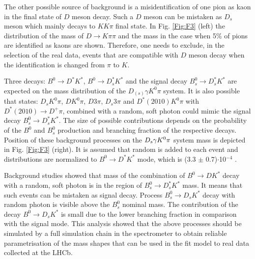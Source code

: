 \documentclass{appolb}
\begin{document}
The other possible source of background is a misidentification of one pion as kaon in the final state of $D$ meson decay. Such a $D$ meson can be mistaken as $D_s$ meson which mainly decays to $K K \pi$ final state. In Fig. \ref{Fig:F3} (left) the distribution of the mass of $D \rightarrow K \pi \pi$ and the mass in the case when 5\% of pions are identified as kaons are shown. Therefore, one needs to exclude, in the selection of the real data, events that are compatible with $D$ meson decay when the identification is changed from $\pi$  to $K$.  

Three decays: $B^0 \rightarrow D^* K^*$, $B^0 \rightarrow D^*_s K^*$ and the signal decay $B_s^0\rightarrow D^*_s K^*$ are expected on the mass distribution of the $D_{(s)} \gamma K^0 \pi$ system. It is also possible that states: $D_s K^0 \pi$, $D K^0 \pi$, $D 3\pi$, $D_s 3\pi$ and  $D^*(2010)K^0 \pi$ with $D^*(2010)\rightarrow D^+ \pi$, combined with a random, soft photon could mimic the signal decay $ B^0_s\rightarrow D^*_s K^*$. The size of possible contributions depends on the probability of the $B^0$ and $B^0_s$ production and branching fraction of the respective decays. Position of these background processes on the $D_s {\gamma} K^0 \pi$ system mass is depicted in Fig. \ref{Fig:F3} (right). It is assumed that random \g is added to each event and distributions are normalized to $B^0\rightarrow D^*K^*$ mode, which is (3.3 $\pm$ 0.7)$\cdot$10$^{-4}$ \cite{pdg_group}. 

Background studies showed that mass of the combination of  $B^0 \rightarrow DK^*$ decay with a random, soft photon is in the region of  $B_s^0 \rightarrow D^*_s K^*$ mass. It means that such events can be mistaken as signal decay. Process $B_s^0\rightarrow D_s K^*$ decay with random photon is visible above the $B^0_s$ nominal mass.
The contribution of the decay $B^0 \rightarrow D_sK^*$ is small
due to the lower branching fraction in comparison with the signal mode. This analysis showed that the above processes should be simulated by a full simulation chain in the spectrometer to obtain reliable parametrisation of the mass shapes that can be used in the fit model to real data collected at the LHCb.
\end{document}
